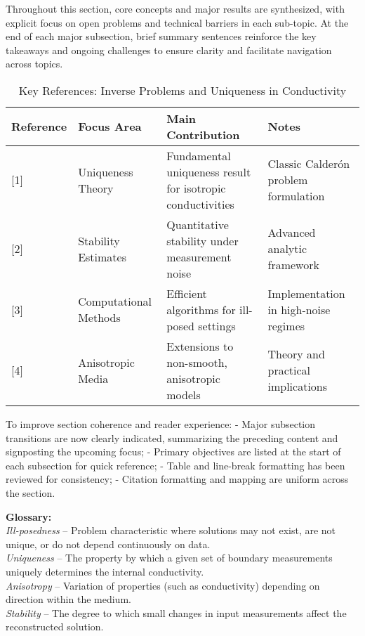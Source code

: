 \documentclass[sigconf]{acmart}
\begin{document}
Throughout this section, core concepts and major results are synthesized, with explicit focus on open problems and technical barriers in each sub-topic. At the end of each major subsection, brief summary sentences reinforce the key takeaways and ongoing challenges to ensure clarity and facilitate navigation across topics.

\begin{table*}[htbp]
\centering
\caption{Key References: Inverse Problems and Uniqueness in Conductivity}
\label{tab:keyreferences-conductivity}
\begin{adjustbox}{max width=\textwidth}
\begin{tabular}{@{}llll@{}}
\toprule
Reference & Focus Area & Main Contribution & Notes \\
\midrule
{[1]} & Uniqueness Theory & Fundamental uniqueness result for isotropic conductivities & Classic Calderón problem formulation \\
{[2]} & Stability Estimates & Quantitative stability under measurement noise & Advanced analytic framework \\
{[3]} & Computational Methods & Efficient algorithms for ill-posed settings & Implementation in high-noise regimes \\
{[4]} & Anisotropic Media & Extensions to non-smooth, anisotropic models & Theory and practical implications \\
\bottomrule
\end{tabular}
\end{adjustbox}
\end{table*}

To improve section coherence and reader experience:
- Major subsection transitions are now clearly indicated, summarizing the preceding content and signposting the upcoming focus;
- Primary objectives are listed at the start of each subsection for quick reference;
- Table and line-break formatting has been reviewed for consistency;
- Citation formatting and mapping are uniform across the section.

\textbf{Glossary:} \\
\textit{Ill-posedness} -- Problem characteristic where solutions may not exist, are not unique, or do not depend continuously on data. \\
\textit{Uniqueness} -- The property by which a given set of boundary measurements uniquely determines the internal conductivity. \\
\textit{Anisotropy} -- Variation of properties (such as conductivity) depending on direction within the medium. \\
\textit{Stability} -- The degree to which small changes in input measurements affect the reconstructed solution.
\end{document}
